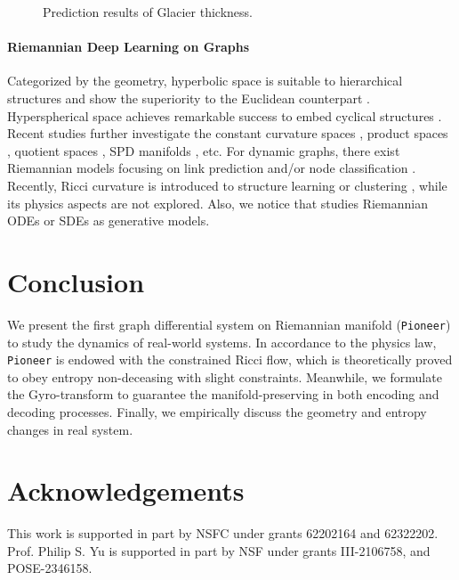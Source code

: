 \begin{figure} 
\centering 
{}
\vspace{-0.1in}
 \caption{Prediction results of Glacier thickness.}
\label{Fig-glacier}
\end{figure}


\paragraph{Riemannian Deep Learning on Graphs}
Categorized by the geometry, 
hyperbolic space is suitable to hierarchical structures and show the superiority to the Euclidean counterpart \cite{icml24sun,fu24icml,aaai24YCWei}.
Hyperspherical space achieves remarkable success to embed cyclical structures \cite{icml23sphereFourier}.
Recent studies further investigate the constant curvature spaces \cite{icml20kGCN,nips24sun}, product spaces \cite{iclr19Gu,aaai22sunli,aaai24sunli}, quotient spaces \cite{nips22QGCN}, SPD manifolds \cite{icml23GyroSpace}, etc. 
For dynamic graphs, there exist Riemannian models focusing on link prediction and/or node classification \cite{kdd21yang,aaai21sunli,cikm22sunli,aaai23sunli}.
Recently, Ricci curvature is introduced to structure learning \cite{icml23revisitRicci,icdm23sunli} or clustering \cite{ijcai23sunli}, while its physics aspects are not explored.
Also, we notice that \citet{nips20mainfoldode,www24sunli,sigir24sunli,WangSun24cikm,iclr24FlowMatch} studies Riemannian ODEs or SDEs as generative models.




\section{Conclusion}
We present the first graph differential system on Riemannian manifold (\texttt{Pioneer}) to study the dynamics of real-world systems.
In accordance to the physics law, \texttt{Pioneer} is endowed with the  constrained Ricci flow, which is theoretically proved to obey entropy non-deceasing with slight constraints.
Meanwhile, we formulate the Gyro-transform to guarantee the manifold-preserving in both encoding and decoding processes.
Finally, we empirically discuss the geometry and entropy changes in real system.

\newpage

\section{Acknowledgements}
This work is supported in part by NSFC under grants 62202164 and 62322202.
Prof. Philip S. Yu  is supported in part by NSF under grants III-2106758, and POSE-2346158.
